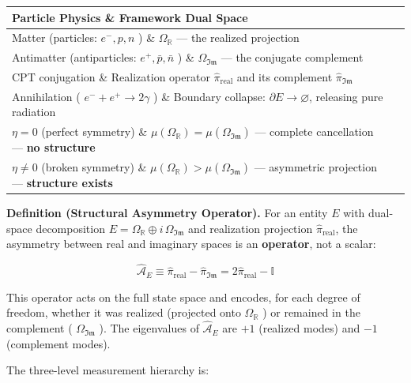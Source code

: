 \documentclass[11pt,a4paper]{article}
\theoremstyle{definition}\newtheorem{definition}{Definition}
\theoremstyle{remark}\newtheorem{remark}{Remark}
\begin{document}
\begin{longtable}{ll}
\hline
Particle Physics \& Framework Dual Space \\
\hline
Matter (particles: $e^-, p, n$ ) \& $\Omega_{\mathbb{R}}$ — the realized projection \\
Antimatter (antiparticles: $e^+, \bar{p}, \bar{n}$ ) \& $\Omega_{\mathfrak{Im}}$ — the conjugate complement \\
CPT conjugation \& Realization operator $\hat{\pi}_{\text{real}}$ and its complement $\hat{\pi}_{\mathfrak{Im}}$ \\
Annihilation ( $e^- + e^+ \to 2\gamma$ ) \& Boundary collapse: $\partial E \to \varnothing$, releasing pure radiation \\
$\eta = 0$ (perfect symmetry) \& $\mu(\Omega_{\mathbb{R}}) = \mu(\Omega_{\mathfrak{Im}})$ — complete cancellation — \textbf{no structure} \\
$\eta \neq 0$ (broken symmetry) \& $\mu(\Omega_{\mathbb{R}}) > \mu(\Omega_{\mathfrak{Im}})$ — asymmetric projection — \textbf{structure exists} \\
\hline
\end{longtable}
\textbf{Definition (Structural Asymmetry Operator).} For an entity $E$ with dual-space decomposition $E = \Omega_{\mathbb{R}} \oplus i\,\Omega_{\mathfrak{Im}}$ and realization projection $\hat{\pi}_{\text{real}}$, the asymmetry between real and imaginary spaces is an \textbf{operator}, not a scalar:


\begin{equation}
\hat{\mathcal{A}}_E \equiv \hat{\pi}_{\text{real}} - \hat{\pi}_{\mathfrak{Im}} = 2\hat{\pi}_{\text{real}} - \mathbb{I}
\end{equation}


This operator acts on the full state space and encodes, for each degree of freedom, whether it was realized (projected onto $\Omega_{\mathbb{R}}$ ) or remained in the complement ( $\Omega_{\mathfrak{Im}}$ ). The eigenvalues of $\hat{\mathcal{A}}_E$ are $+1$ (realized modes) and $-1$ (complement modes).

The three-level measurement hierarchy is:
\end{document}
